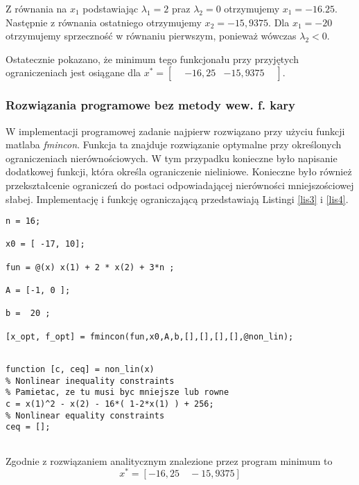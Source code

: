 \documentclass[a4paper,15pt]{article}
\begin{document}
Z równania na \( x_{1} \) podstawiając \( \lambda_{1} = 2 \) praz \( \lambda_{2} = 0 \) otrzymujemy \( x_{1} = -16.25 \). Następnie z równania ostatniego otrzymujemy \( x_{2} = -15,9375 \). Dla \( x_{1} = -20 \) otrzymujemy sprzeczność w równaniu pierwszym, ponieważ wówczas \( \lambda_{2} < 0 \). 

Ostatecznie pokazano, że minimum tego funkcjonału przy przyjętych ograniczeniach jest osiągane dla 
\( x^{*} = \begin{bmatrix}
& -16,25 & -15,9375 &
\end{bmatrix} \). 
\subsubsection{Rozwiązania programowe bez metody wew. f. kary}
W implementacji programowej zadanie najpierw rozwiązano przy użyciu funkcji matlaba \textit{fmincon}. Funkcja ta znajduje rozwiązanie optymalne przy określonych ograniczeniach nierównościowych. W tym przypadku konieczne było napisanie dodatkowej funkcji, która określa ograniczenie nieliniowe. Konieczne było również przekształcenie ograniczeń do postaci odpowiadającej nierówności mniejszościowej słabej. \vspace{7pt}
Implementację i funkcję ograniczającą przedstawiają Listingi \ref{lis3} i \ref{lis4}.

\begin{lstlisting}[caption=Znalezienie minimum z ograniczeniami ( fmincon ), captionpos=b,label=lis3, firstnumber=12,frame=single]
% znalezienie minimum z ograniczeniami
n = 16;

x0 = [ -17, 10]; 

fun = @(x) x(1) + 2 * x(2) + 3*n ;

A = [-1, 0 ];
 
b =  20 ;

[x_opt, f_opt] = fmincon(fun,x0,A,b,[],[],[],[],@non_lin);


\end{lstlisting}

\begin{lstlisting}[caption=Ograniczenie nieliniowe, captionpos=b,label=lis4, firstnumber=12,frame=single]
function [c, ceq] = non_lin(x)
% Nonlinear inequality constraints
% Pamietac, ze tu musi byc mniejsze lub rowne
c = x(1)^2 - x(2) - 16*( 1-2*x(1) ) + 256;
% Nonlinear equality constraints
ceq = [];


\end{lstlisting}


Zgodnie z rozwiązaniem analitycznym znalezione przez program minimum to \\
\begin{equation}
x^{*} = [ -16,25  \quad -15,9375  ] 
\end{equation}
\end{document}
